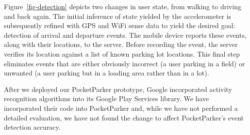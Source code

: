 Figure~\ref{fig-detection} depicts two changes in user state, from walking to
driving and back again.  The initial inference of state yielded by the
accelerometer is subsequently refined with GPS and WiFi sense data to yield
the desired goal:  detection of arrival and departure events.  The mobile
device reports these events, along with their locations, to the server.
Before recording the event, the server verifies its location against a list
of known parking lot locations.  This final step eliminates events that are
either obviously incorrect (a user parking in a field) or unwanted (a user
parking but in a loading area rather than in a lot).

\newpage

After we deployed our PocketParker prototype, Google incorporated activity
recognition algorithms into its Google Play Services library. We have
incorporated their code into PocketParker and, while we have not performed a
detailed evaluation, we have not found the change to affect PocketParker's
event detection accuracy.
